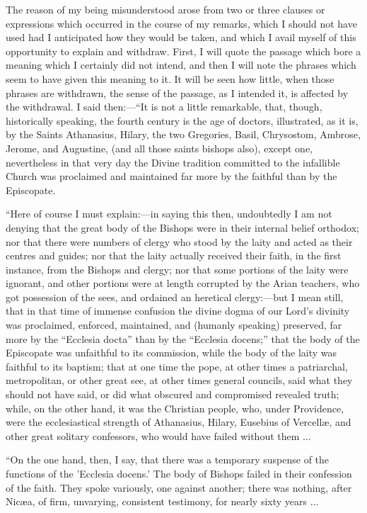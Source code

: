 The reason of my being misunderstood arose from two or three
clauses or expressions which occurred in the course of my remarks,
which I should not have used had I anticipated how they would be
taken, and which I avail myself of this opportunity to explain and
withdraw. First, I will quote the passage which bore a meaning which I
certainly did not intend, and then I will note the phrases which seem
to have given this meaning to it. It will be seen how little, when
those phrases are withdrawn, the sense of the passage, as I intended
it, is affected by the withdrawal. I said then:—``It is not a
little remarkable, that, though, historically speaking, the fourth
century is the age of doctors, illustrated, as it is, by the Saints
Athanasius, Hilary, the two Gregories, Basil, Chrysostom, Ambrose,
Jerome, and Augustine, (and all those saints bishops also), except
one, nevertheless in that very day the Divine tradition committed to
the infallible Church was proclaimed and maintained far more by the
faithful than by the Episcopate.

``Here of course I must explain:—in saying this then,
undoubtedly I am not denying that the great body of the Bishops were
in their internal belief orthodox; nor that there were numbers of
clergy who stood by the laity and acted as their centres and guides;
nor that the laity actually received their faith, in the first
instance, from the Bishops and clergy; nor that some portions of the
laity were ignorant, and other portions were at length corrupted by
the Arian teachers, who got possession of the sees, and ordained an
heretical clergy:—but I mean still, that in that time of immense
confusion the divine dogma of our Lord's divinity was proclaimed,
enforced, maintained, and (humanly speaking) preserved, far more by
the ``Ecclesia docta'' than by the ``Ecclesia docens;''
that the body of the Episcopate was unfaithful to its commission,
while the body of the laity was faithful to its baptism; that at one
time the pope, at other times a patriarchal, metropolitan, or other
great see, at other times general councils, said what they
should not have said, or did what obscured and compromised revealed
truth; while, on the other hand, it was the Christian people, who,
under Providence, were the ecclesiastical strength of Athanasius,
Hilary, Eusebius of Vercellæ, and other great solitary confessors,
who would have failed without them ...

``On the one hand, then, I say, that there was a temporary
suspense of the functions of the 'Ecclesia docens.' The body of
Bishops failed in their confession of the faith. They spoke variously,
one against another; there was nothing, after Nicæa, of firm,
unvarying, consistent testimony, for nearly sixty years ...

